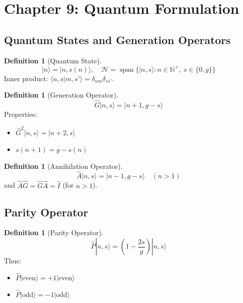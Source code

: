 \documentclass[12pt]{article}
\theoremstyle{definition}
\newtheorem{definition}[theorem]{Definition}
\newcommand{\N}{\mathbb{N}}
\begin{document}
\newpage


\section{Chapter 9: Quantum Formulation}

\subsection{Quantum States and Generation Operators}

\begin{definition}[Quantum State]
\[
|n\rangle = |n, s(n)\rangle, \quad \mathcal{H} = \operatorname{span}\{|n,s\rangle : n \in \N^+,\ s \in \{0,g\}\}
\]
Inner product: \(\langle n,s | m,s' \rangle = \delta_{nm}\delta_{ss'}\).
\end{definition}

\begin{definition}[Generation Operator]
\[
\hat{G}|n,s\rangle = |n+1, g-s\rangle
\]
Properties:
\begin{itemize}
    \item \(\hat{G}^2|n,s\rangle = |n+2, s\rangle\)
    \item \(s(n+1) = g - s(n)\)
\end{itemize}
\end{definition}

\begin{definition}[Annihilation Operator]
\[
\hat{A}|n,s\rangle = |n-1, g-s\rangle \quad (n>1)
\]
and \(\hat{A}\hat{G} = \hat{G}\hat{A} = \hat{I}\) (for \(n>1\)).
\end{definition}

\subsection{Parity Operator}

\begin{definition}[Parity Operator]
\[
\hat{P}|n,s\rangle = \left(1 - \frac{2s}{g}\right)|n,s\rangle
\]
Thus:
\begin{itemize}
    \item \(\hat{P}|\text{even}\rangle = +1|\text{even}\rangle\)
    \item \(\hat{P}|\text{odd}\rangle = -1|\text{odd}\rangle\)
\end{itemize}
\end{definition}
\end{document}
